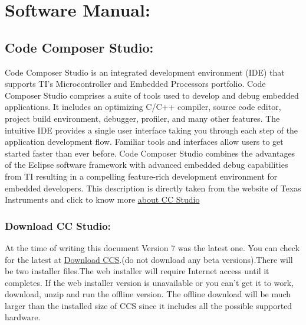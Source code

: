 \documentclass[a4paper,10pt,oneside]{article}
\begin{document}
{	\section{\Huge\textbf{Software Manual:}}
		\subsection{\huge \textbf{Code Composer Studio:}}
			{\large Code Composer Studio is an integrated development environment (IDE) that supports TI's Microcontroller and Embedded Processors portfolio. Code Composer Studio comprises a suite of tools used to develop and debug embedded applications. It includes an optimizing C/C++ compiler, source code editor, project build environment, debugger, profiler, and many other features. The intuitive IDE provides a single user interface taking you through each step of the application development flow. Familiar tools and interfaces allow users to get started faster than ever before. Code Composer Studio combines the advantages of the Eclipse software framework with advanced embedded debug capabilities from TI resulting in a compelling feature-rich development environment for embedded developers. This description is directly taken from the website of Texas Instruments and click to know more	\href{http://www.ti.com/tool/ccstudio}{about CC Studio}}}%
			\subsubsection{\Large\textbf{Download CC Studio:}}
			{\large At the time of writing this document Version 7 was the latest one. You can check for the latest at \href{http://processors.wiki.ti.com/index.php/Download_CCS}{Download CCS}.(do not download
				any beta versions).There will be two installer files.The web installer will require Internet access until it	completes. If the web installer version is unavailable or you can’t get it to work,
				download, unzip and run the offline version. The offline download will be much larger
				than the installed size of CCS since it includes all the possible supported hardware.}
\end{document}
